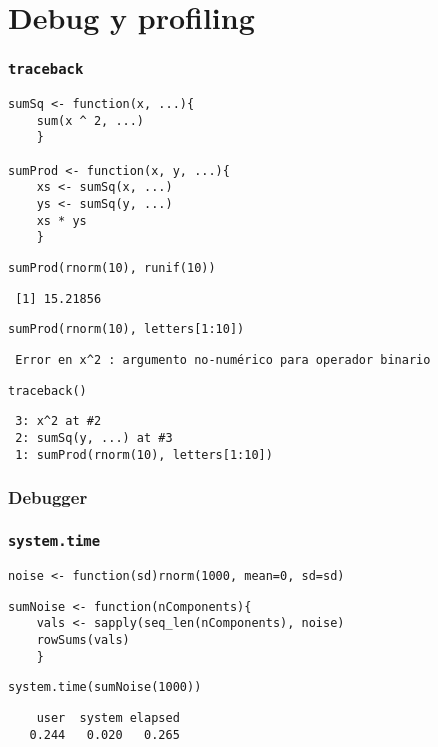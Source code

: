 \documentclass[xcolor={usenames,svgnames,dvipsnames}]{beamer}
\begin{document}
\section{Debug y profiling}
\label{sec-3}
\begin{frame}[fragile]
\frametitle{\texttt{traceback}}
\label{sec-3-1}


\lstset{language=R}
\begin{lstlisting}
sumSq <- function(x, ...){
    sum(x ^ 2, ...)
    }

sumProd <- function(x, y, ...){
    xs <- sumSq(x, ...)
    ys <- sumSq(y, ...)
    xs * ys
    }
\end{lstlisting}



\lstset{language=R}
\begin{lstlisting}
sumProd(rnorm(10), runif(10))
\end{lstlisting}

\begin{verbatim}
 [1] 15.21856
\end{verbatim}


\lstset{language=R}
\begin{lstlisting}
sumProd(rnorm(10), letters[1:10])
\end{lstlisting}

\begin{verbatim}
 Error en x^2 : argumento no-numérico para operador binario
\end{verbatim}


\lstset{language=R}
\begin{lstlisting}
traceback()
\end{lstlisting}

\begin{verbatim}
 3: x^2 at #2
 2: sumSq(y, ...) at #3
 1: sumProd(rnorm(10), letters[1:10])
\end{verbatim}
\end{frame}
\begin{frame}
\frametitle{Debugger}
\label{sec-3-2}
\end{frame}
\begin{frame}[fragile]
\frametitle{\texttt{system.time}}
\label{sec-3-3}


\lstset{language=R}
\begin{lstlisting}
noise <- function(sd)rnorm(1000, mean=0, sd=sd)
\end{lstlisting}



\lstset{language=R}
\begin{lstlisting}
sumNoise <- function(nComponents){
    vals <- sapply(seq_len(nComponents), noise)
    rowSums(vals)
    }
\end{lstlisting}



\lstset{language=R}
\begin{lstlisting}
system.time(sumNoise(1000))
\end{lstlisting}

\begin{verbatim}
    user  system elapsed 
   0.244   0.020   0.265
\end{verbatim}
\end{frame}
\end{document}
